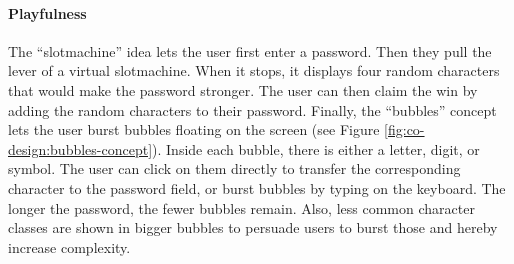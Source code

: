 \paragraph{Playfulness} The ``slotmachine'' idea lets the user first enter a password. Then they pull the lever of a virtual slotmachine. When it stops, it displays four random characters that would make the password stronger. The user can then claim the win by adding the random characters to their password. Finally, the ``bubbles'' concept lets the user burst bubbles floating on the screen (see Figure \ref{fig:co-design:bubbles-concept}). Inside each bubble, there is either a letter, digit, or symbol. The user can click on them directly to transfer the corresponding character to the password field, or burst bubbles by typing on the keyboard. The longer the password, the fewer bubbles remain. Also, less common character classes are shown in bigger bubbles to persuade users to burst those and hereby increase complexity. 

